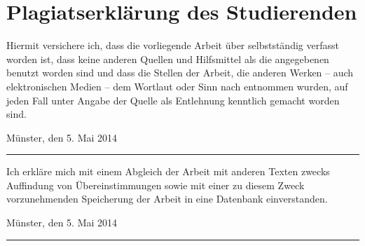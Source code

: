 \section*{Plagiatserklärung des Studierenden}
Hiermit versichere ich, dass die vorliegende Arbeit über \emph{\MyTitle} selbstständig verfasst worden ist, dass keine anderen Quellen und Hilfsmittel als die angegebenen benutzt worden sind und dass die Stellen der Arbeit, die anderen Werken – auch elektronischen Medien – dem Wortlaut oder Sinn nach entnommen wurden, auf jeden Fall unter Angabe der Quelle als Entlehnung kenntlich gemacht worden sind.

\vspace{.5cm}\hfill Münster, den 5. Mai 2014\hspace{.6cm}\rule{6cm}{.5pt}
\vspace{1cm}

Ich erkläre mich mit einem Abgleich der Arbeit mit anderen Texten zwecks Auffindung von Übereinstimmungen sowie mit einer zu diesem Zweck vorzunehmenden Speicherung der Arbeit in eine Datenbank einverstanden.

\vspace{.5cm}\hfill Münster, den 5. Mai 2014\hspace{.6cm}\rule{6cm}{.5pt}

